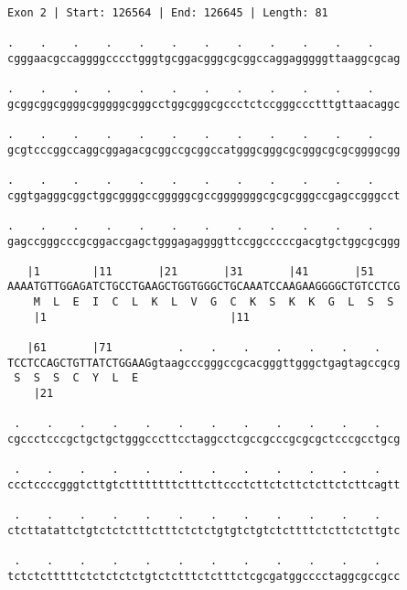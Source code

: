 \documentclass{article}
\begin{document}
 \begin{Verbatim}
 
Exon 2 | Start: 126564 | End: 126645 | Length: 81
 
.    .    .    .    .    .    .    .    .    .    .    .    
cgggaacgccaggggcccctgggtgcggacgggcgcggccaggagggggttaaggcgcag
                                                            
.    .    .    .    .    .    .    .    .    .    .    .    
gcggcggcggggcgggggcgggcctggcgggcgccctctccgggccctttgttaacaggc
                                                            
.    .    .    .    .    .    .    .    .    .    .    .    
gcgtcccggccaggcggagacgcggccgcggccatgggcgggcgcgggcgcgcggggcgg
                                                            
.    .    .    .    .    .    .    .    .    .    .    .    
cggtgagggcggctggcggggccgggggcgccgggggggcgcgcgggccgagccgggcct
                                                            
.    .    .    .    .    .    .    .    .    .    .    .    
gagccgggcccgcggaccgagctgggagaggggttccggcccccgacgtgctggcgcggg
                                                            
   |1        |11       |21       |31       |41       |51    
AAAATGTTGGAGATCTGCCTGAAGCTGGTGGGCTGCAAATCCAAGAAGGGGCTGTCCTCG
    M  L  E  I  C  L  K  L  V  G  C  K  S  K  K  G  L  S  S 
    |1                            |11                       
  
   |61       |71          .    .    .    .    .    .    .   
TCCTCCAGCTGTTATCTGGAAGgtaagcccgggccgcacgggttgggctgagtagccgcg
 S  S  S  C  Y  L  E                                        
    |21                                                     
  
 .    .    .    .    .    .    .    .    .    .    .    .   
cgccctcccgctgctgctgggcccttcctaggcctcgccgcccgcgcgctcccgcctgcg
                                                            
 .    .    .    .    .    .    .    .    .    .    .    .   
ccctccccgggtcttgtcttttttttctttcttccctcttctcttctcttctcttcagtt
                                                            
 .    .    .    .    .    .    .    .    .    .    .    .   
ctcttatattctgtctctctttctttctctctgtgtctgtctcttttctcttctcttgtc
                                                            
 .    .    .    .    .    .    .    .    .    .    .    .   
tctctctttttctctctctctgtctctttctctttctcgcgatggcccctaggcgccgcc
                                                            

\end{Verbatim}
\end{document}
